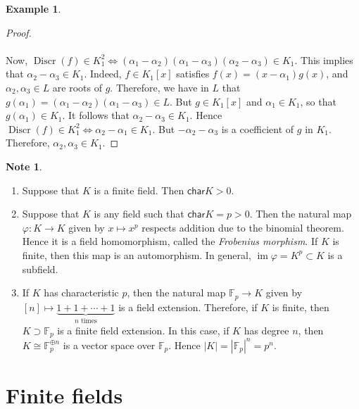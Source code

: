 \documentclass[10pt,letterpaper,cm]{nupset}
\theoremstyle{definition}
\newtheorem{exmp}{Example}
\newtheorem{note}{Note}
\newcommand{\F}{\mathbb F}
\newcommand{\1}{\mathbf{1}}
\newcommand{\0}{\vec 0}
\newcommand{\Char}{\mathsf{char}}
\DeclareMathOperator{\im}{im}
\DeclareMathOperator{\disc}{Discr}
\begin{document}
\begin{exmp}
\begin{proof}
\\ \\
Now, $\disc(f) \in K_1^2 \iff (\alpha_1 - \alpha_2) ( \alpha_1 - \alpha_3)(\alpha_2 - \alpha_3) \in K_1$. This implies that $\alpha_2 - \alpha_3 \in K_1$. Indeed, $f\in K_1[x]$ satisfies $f(x) = (x-\alpha_1)g(x)$, and $\alpha_2, \alpha_3 \in L$ are roots of $g$. Therefore, we have in $L$ that $g(\alpha_1) = (\alpha_1 - \alpha_2)(\alpha_1 - \alpha_3) \in L$. But $g\in K_1[x]$ and $\alpha_1 \in K_1$, so that $g(\alpha_1) \in K_1$. It follows that $\alpha_2 - \alpha_3 \in K_1$. Hence $\disc(f) \in K_1^2 \iff \alpha_2 - \alpha_1 \in K_1$. But $-\alpha_2 -\alpha_3$ is a coefficient of $g$ in $K_1$. Therefore, $\alpha_2, \alpha_3 \in K_1$. 
\end{proof}
\end{exmp}

\begin{note} $ $
\begin{enumerate}
\item Suppose that $K$ is a finite field. Then $\Char{K}>0$. 
\item Suppose that $K$ is any field such that $\Char{K} = p>0$. Then the natural map $\varphi : K \to K$ given by $x \mapsto x^p$ respects addition due to the binomial theorem. Hence it is a field homomorphism, called the \textit{Frobenius morphism}. If $K$ is finite, then this map is an automorphism. In general, $\im{\varphi} =K^p \subset K$ is a subfield. 
\item If $K$ has characteristic $p$, then the natural map $\F_p \to K$ given by $[n] \mapsto \underbrace{1 + 1 +\cdots +1}_{n \text{ times}}$ is a field extension. Therefore, if $K$ is finite, then $K\supset \F_p$ is a finite field extension. In this case, if $K$ has degree $n$, then $K \cong  \F_p^{\oplus n}$ is a vector space over $\F_p$. Hence $|K| = |\F_p|^n = p^n$. 
\end{enumerate}
\end{note}

\section{Finite fields}
\end{document}
